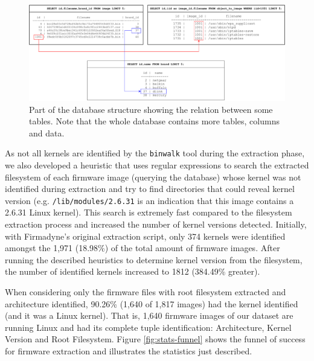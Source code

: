 \begin{figure}[H]
    \centering
    \includegraphics[width=1.0 \textwidth]{figs/SQL_Schema.pdf}
    \caption{Part of the database structure showing the relation between some tables. Note that the whole database contains more tables, columns and data.}
    \label{fig:sql-schema}
\end{figure}

As not all kernels are identified by the {\tt binwalk} tool during the extraction phase, we also developed a heuristic that uses regular expressions to search the extracted filesystem of each firmware image (querying the database) whose kernel was not identified during extraction and try to find directories that could reveal kernel version (e.g. {\tt /lib/modules/2.6.31} is an indication that this image contains a 2.6.31 Linux kernel). This search is extremely fast compared to the filesystem extraction process and increased the number of kernel versions detected. Initially, with Firmadyne's \cite{firmadyne} original extraction script, only 374 kernels were identified amongst the 1,971 (18.98\%) of the total amount of firmware images. After running the described heuristics to determine kernel version from the filesystem, the number of identified kernels increased to 1812 (384.49\% greater).

When considering only the firmware files with root filesystem extracted and architecture identified, 90.26\% (1,640 of 1,817 images) had the kernel identified (and it was a Linux kernel). That is, 1,640 firmware images of our dataset are running Linux and had its complete tuple identification: Architecture, Kernel Version and Root Filesystem. Figure \ref{fig:stats-funnel} shows the funnel of success for firmware extraction and illustrates the statistics just described.

